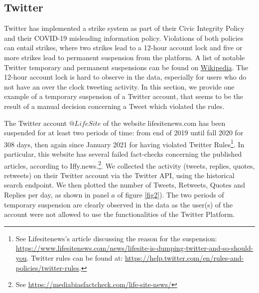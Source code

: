 \documentclass{article}
\begin{document}
\subsection{Twitter}

Twitter has implemented a strike system as part of their Civic Integrity Policy and their COVID-19 misleading information policy. Violations of both policies can entail strikes, where two strikes lead to a 12-hour account lock and five or more strikes lead to permanent suspension from the platform. A list of notable Twitter temporary and permanent suspensions can be found on  \href{https://en.wikipedia.org/wiki/Twitter_suspensions}{Wikipedia}. The 12-hour account lock is hard to observe in the data, especially for users who do not have an over the clock tweeting activity. In this section, we provide one example of a temporary suspension of a Twitter account, that seems to be the result of a manual decision concerning a Tweet which violated the rules. 

The Twitter account $@LifeSite$ of the website lifesitenews.com has been suspended for at least two periods of time: from end of 2019 until fall 2020 for 308 days, then again since January 2021 for having violated Twitter Rules\footnote{See Lifesitenews's article discussing the reason for the suspension: \href{https://www.lifesitenews.com/news/lifesite-is-dumping-twitter-and-so-should-you}{https://www.lifesitenews.com/news/lifesite-is-dumping-twitter-and-so-should-you}. Twitter rules can be found at: \href{https://help.twitter.com/en/rules-and-policies/twitter-rules}{https://help.twitter.com/en/rules-and-policies/twitter-rules}. }. In particular, this website has several failed fact-checks concerning the published articles, according to Iffy.news.\footnote{See \href{https://mediabiasfactcheck.com/life-site-news/}{https://mediabiasfactcheck.com/life-site-news/}}. We collected the activity (tweets, replies, quotes, retweets) on their Twitter account via the Twitter API, using the historical search endpoint. We then plotted the number of Tweets, Retweets, Quotes and Replies per day, as shown in panel $a$ of figure \ref{fig2}). The two periods of temporary suspension are clearly observed in the data as the user(s) of the account were not allowed to use the functionalities of the Twitter Platform. 
\end{document}
